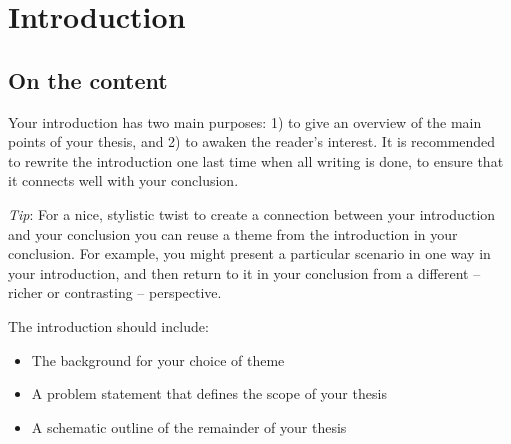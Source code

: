 \documentclass[a4paper,twoside]{bth}
\begin{document}

\chapter{Introduction}
\label{chp:introduction}  %
\section{On the content}
Your introduction has two main purposes: 1) to give an overview of the main points of your thesis, and 2) to awaken the reader's interest. It is recommended to rewrite the introduction one last time when all writing is done, to ensure that it connects well with your conclusion.

\emph{Tip}: For a nice, stylistic twist to create a connection between your introduction and your conclusion you can reuse a theme from the introduction in your conclusion. For example, you might present a particular scenario in one way in your introduction, and then return to it in your conclusion from a different -- richer or contrasting -- perspective.

The introduction should include:
\begin{itemize}
    \item The background for your choice of theme
    \item A problem statement that defines the scope of your thesis
    \item A schematic outline of the remainder of your thesis 
\end{itemize}
\end{document}
